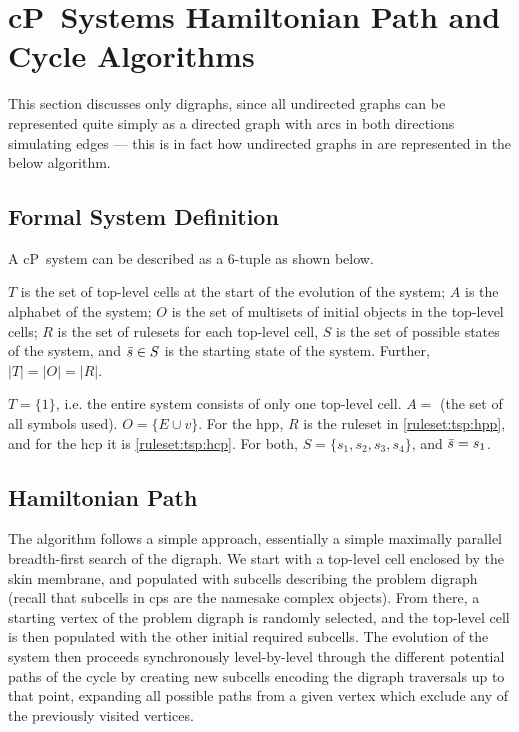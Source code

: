\section{\label{sec:tsp:algohpp}cP~Systems Hamiltonian Path and Cycle Algorithms}

This section discusses only digraphs, since all undirected graphs can be represented quite simply as a directed graph with arcs in both directions simulating edges --- this is in fact how undirected graphs in are represented in the below algorithm.

\subsection{Formal System Definition}
A cP~system can be described as a 6-tuple as shown below.

\cptupletemplate{}

\(T\) is the set of top-level cells at the start of the evolution of the system; \(A\) is the alphabet of the system; \(O\) is the set of multisets of initial objects in the top-level cells; \(R\) is the set of rulesets for each top-level cell, \(S\) is the set of possible states of the system, and \(\Bar{s} \in S\) is the starting state of the system. Further, \(|T| = |O| = |R|\).

\(T = \{1\}\), i.e. the entire system consists of only one top-level cell.  \(A = \) (the set of all symbols used).  \(O = \{E \cup v\}\).  For the \gls{hpp}, \(R\) is the ruleset in \cref{ruleset:tsp:hpp}, and for the \gls{hcp} it is \cref{ruleset:tsp:hcp}.  For both, \(S = \{s_1, s_2, s_3, s_4\}\), and \(\Bar{s} = s_1\).



\subsection{Hamiltonian Path}
The algorithm follows a simple approach, essentially a simple maximally parallel breadth-first search of the digraph.  We start with a top-level cell enclosed by the skin membrane, and populated with subcells describing the problem digraph (recall that subcells in \gls{cps} are the namesake complex objects).  From there, a starting vertex of the problem digraph is randomly selected, and the top-level cell is then populated with the other initial required subcells.  The evolution of the system then proceeds synchronously level-by-level through the different potential paths of the cycle by creating new subcells encoding the digraph traversals up to that point, expanding all possible paths from a given vertex which exclude any of the previously visited vertices.

